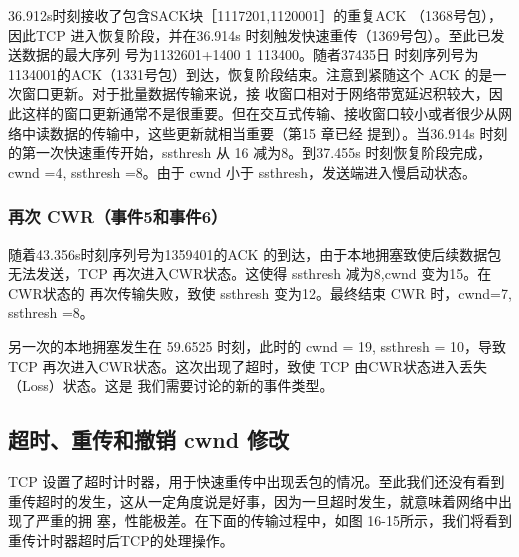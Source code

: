 36.912s时刻接收了包含SACK块［1117201,1120001］的重复ACK （1368号包），因此TCP 进入恢复阶段，并在36.914s 时刻触发快速重传（1369号包）。至此已发送数据的最大序列
号为1132601+1400 1 113400。随者37435日 时刻序列号为 1134001的ACK（1331号包）到达，恢复阶段结束。注意到紧随这个 ACK 的是一次窗口更新。对于批量数据传输来说，接
收窗口相对于网络带宽延迟积较大，因此这样的窗口更新通常不是很重要。但在交互式传输、接收窗口较小或者很少从网络中读数据的传输中，这些更新就相当重要（第15 章已经
提到）。当36.914s 时刻的第一次快速重传开始，ssthresh 从 16 减为8。到37.455s 时刻恢复阶段完成，cwnd =4, ssthresh =8。由于 cwnd 小于 ssthresh，发送端进入慢启动状态。

\subsubsection{再次 CWR（事件5和事件6）}
随着43.356s时刻序列号为1359401的ACK 的到达，由于本地拥塞致使后续数据包无法发送，TCP 再次进入CWR状态。这使得 ssthresh 减为8,cwnd 变为15。在CWR状态的
再次传输失败，致使 ssthresh 变为12。最终结束 CWR 时，cwnd=7, ssthresh =8。

另一次的本地拥塞发生在 59.6525 时刻，此时的 cwnd = 19, ssthresh = 10，导致 TCP 再次进入CWR状态。这次出现了超时，致使 TCP 由CWR状态进入丢失（Loss）状态。这是
我们需要讨论的新的事件类型。

\subsection{超时、重传和撤销 cwnd 修改}
TCP 设置了超时计时器，用于快速重传中出现丢包的情况。至此我们还没有看到重传超时的发生，这从一定角度说是好事，因为一旦超时发生，就意味着网络中出现了严重的拥
塞，性能极差。在下面的传输过程中，如图 16-15所示，我们将看到重传计时器超时后TCP的处理操作。

